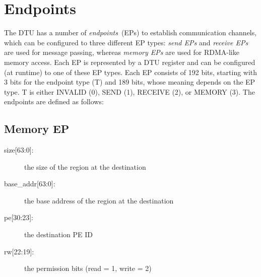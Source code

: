 \documentclass[a4paper,11pt,draft]{article}
\makeatletter
\def\tikzscale{1}\begin{lrbox}{\measure@tikzpicture}%
\edef\tikzscale{\pgfmathresult}%
\makeatother
\begin{document}
\section{Endpoints}

The DTU has a number of \emph{endpoints}~(EPs) to establish communication channels, which can be
configured to three different EP types: \emph{send EPs} and \emph{receive EPs} are used for message
passing, whereas \emph{memory EPs} are used for RDMA-like memory access. Each EP is represented by a
DTU register and can be configured (at runtime) to one of these EP types. Each EP consists of 192
bits, starting with 3 bits for the endpoint type (T) and 189 bits, whose meaning depends on the EP
type. T is either INVALID (0), SEND (1), RECEIVE (2), or MEMORY (3). The endpoints are defined as
follows:

\subsection{Memory EP}

\begin{scaletikzpicturetowidth}{.98\linewidth}
\end{scaletikzpicturetowidth}

\begin{description}
  \item[size{[63:0]}:] the size of the region at the destination
  \item[base\_addr{[63:0]}:] the base address of the region at the destination
  \item[pe{[30:23]}:] the destination PE ID
  \item[rw{[22:19]}:] the permission bits (read = 1, write = 2)
\end{description}
\end{document}
